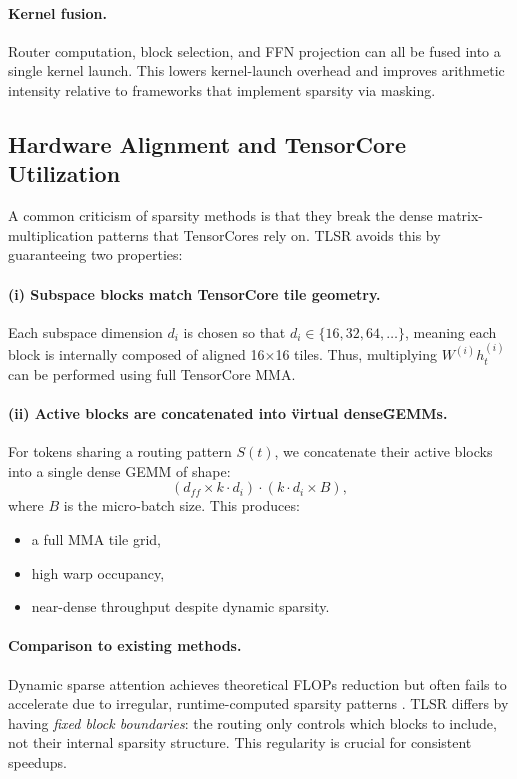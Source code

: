 \documentclass{article}
\theoremstyle{plain}
\theoremstyle{definition}
\theoremstyle{remark}
\begin{document}
\paragraph{Kernel fusion.}
Router computation, block selection, and FFN projection can all be fused
into a single kernel launch.
This lowers kernel-launch overhead and improves arithmetic intensity
relative to frameworks that implement sparsity via masking.

\subsection{Hardware Alignment and TensorCore Utilization}

A common criticism of sparsity methods is that they break the
dense matrix-multiplication patterns that TensorCores rely on.
TLSR avoids this by guaranteeing two properties:

\paragraph{(i) Subspace blocks match TensorCore tile geometry.}
Each subspace dimension $d_i$ is chosen so that $d_i \in \{16, 32, 64, \ldots\}$,
meaning each block is internally composed of aligned 16$\times$16 tiles.
Thus, multiplying $W^{(i)} h_t^{(i)}$ can be performed using full TensorCore MMA.

\paragraph{(ii) Active blocks are concatenated into \"virtual dense\" GEMMs.}
For tokens sharing a routing pattern $S(t)$,
we concatenate their active blocks into a single dense GEMM of shape:
\[
(d_{ff} \times k\cdot d_i) \cdot (k\cdot d_i \times B),
\]
where $B$ is the micro-batch size.
This produces:
\begin{itemize}
\item a full MMA tile grid,
\item high warp occupancy,
\item near-dense throughput despite dynamic sparsity.
\end{itemize}

\paragraph{Comparison to existing methods.}
Dynamic sparse attention achieves theoretical FLOPs reduction but often
fails to accelerate due to irregular, runtime-computed sparsity patterns
\cite{yuan2025nativesparse}.
TLSR differs by having \emph{fixed block boundaries}:
the routing only controls which blocks to include,
not their internal sparsity structure.
This regularity is crucial for consistent speedups.
\end{document}
